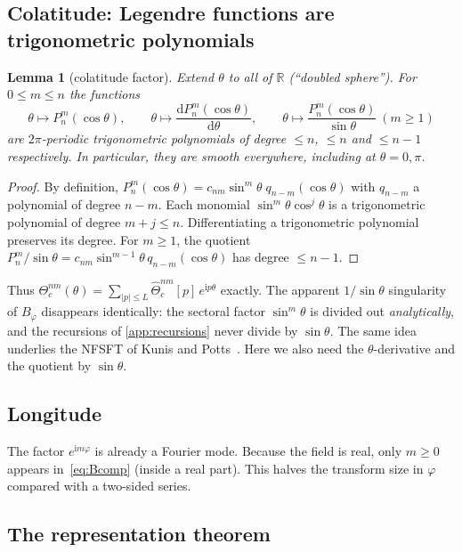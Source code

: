 \documentclass[11pt,a4paper]{article}
\newtheorem{lemma}{Lemma}
\theoremstyle{remark}
\newcommand{\R}{\mathbb{R}}
\newcommand{\Th}{\Theta}
\begin{document}
\subsection{Colatitude: Legendre functions are trigonometric polynomials}

\begin{lemma}[colatitude factor]\label{lem:theta}
Extend $\theta$ to all of $\R$ (``doubled sphere''). For $0\le m\le n$ the functions
\[
\theta\mapsto P_n^m(\cos\theta),\qquad
\theta\mapsto \frac{\mathrm dP_n^m(\cos\theta)}{\mathrm d\theta},\qquad
\theta\mapsto \frac{P_n^m(\cos\theta)}{\sin\theta}\ (m\ge1)
\]
are $2\pi$-periodic trigonometric polynomials of degree $\le n$, $\le n$ and $\le n-1$
respectively. In particular, they are smooth everywhere, including at $\theta=0,\pi$.
\end{lemma}
\begin{proof}
By definition, $P_n^m(\cos\theta)=c_{nm}\sin^m\theta\;q_{n-m}(\cos\theta)$ with $q_{n-m}$ a polynomial of
degree $n-m$. Each monomial $\sin^m\theta\cos^j\theta$ is a trigonometric polynomial of degree
$m+j\le n$. Differentiating a trigonometric polynomial preserves its degree. For $m\ge1$, the
quotient $P_n^m/\sin\theta=c_{nm}\sin^{m-1}\theta\,q_{n-m}(\cos\theta)$ has degree $\le n-1$.
\end{proof}
Thus $\Th_c^{nm}(\theta)=\sum_{|p|\le L}\hat\Th_c^{nm}[p]\,e^{\mathrm ip\theta}$ exactly. The
apparent $1/\sin\theta$ singularity of $B_\varphi$ disappears identically: the sectoral factor
$\sin^m\theta$ is divided out \emph{analytically}, and the recursions of \cref{app:recursions}
never divide by $\sin\theta$. The same idea underlies the NFSFT of Kunis and Potts~\cite{kunis2003}.
Here we also need the $\theta$-derivative and the quotient by $\sin\theta$.

\subsection{Longitude}
The factor $e^{\mathrm im\varphi}$ is already a Fourier mode. Because the field is real, only
$m\ge0$ appears in~\eqref{eq:Bcomp} (inside a real part). This halves the transform size in
$\varphi$ compared with a two-sided series.

\subsection{The representation theorem}
\end{document}
